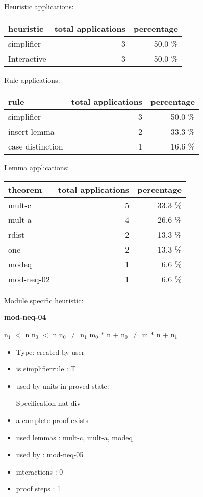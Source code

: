 \documentclass[a4paper]{article}
\begin{document}
\medskip


Heuristic applications:

\begin{supertabular}{l|r|r}
heuristic	& total applications & percentage \\ \hline
simplifier & 3 & 50.0 \% \\
Interactive & 3 & 50.0 \% \\

\end{supertabular}

Rule applications:

\begin{supertabular}{l|r|r}
rule	        & total applications & percentage \\ \hline
simplifier & 3 & 50.0 \% \\
insert lemma & 2 & 33.3 \% \\
case distinction & 1 & 16.6 \% \\

\end{supertabular}

Lemma applications:

\begin{supertabular}{l|r|r}
theorem	        & total applications & percentage \\ \hline
mult-c & 5 & 33.3 \% \\
mult-a & 4 & 26.6 \% \\
rdist & 2 & 13.3 \% \\
one & 2 & 13.3 \% \\
modeq & 1 & 6.6 \% \\
mod-neq-02 & 1 & 6.6 \% \\

\end{supertabular}

Module specific heuristic:

\pagebreak

{\LARGE\bf mod-neq-04}\label{lemma-mod-neq-04}

\medskip

 \Fol $\mbox{n}_{1}$ $<$ n \And $\mbox{n}_{0}$ $<$ n \And $\mbox{n}_{0}$ $\neq$ $\mbox{n}_{1}$ \Imp $\mbox{m}_{0}$ $*$ n + $\mbox{n}_{0}$ $\neq$ m $*$ n + $\mbox{n}_{1}$

\begin{itemize}

\item Type: created by user

\item is simplifierrule : T
\item used by units in proved state:

Specification nat-div
\item       a complete proof exists
\item       used lemmas  : mult-c, mult-a, modeq
\item       used by      : mod-neq-05
\item       interactions : 0
\item       proof steps  : 1
\end{itemize}
\end{document}
